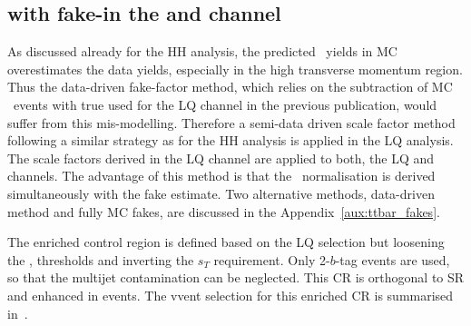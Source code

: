 \subsection{\ttbar with fake-\tauhad in the \lephad and \hadhad channel}
\label{subsec:LQLepHadttbarfake}

As discussed already for the HH analysis, the predicted \ttbar\ yields in MC overestimates the data yields, especially in 
the high transverse momentum region. Thus the data-driven fake-factor method, which relies on the subtraction of 
MC \ttbar\ events with true \tauhad used for the LQ \lephad channel in the previous publication, would suffer from this \ttbar mis-modelling.
Therefore a semi-data driven scale factor method following a similar strategy as for the HH analysis is applied in the LQ analysis.
The scale factors derived in the LQ \lephad channel are applied to both, the LQ \lephad and \hadhad channels. The advantage of this method
is that the \ttbar\ normalisation is derived simultaneously with the fake estimate.
Two alternative methods, data-driven method and fully MC fakes, are  discussed in the Appendix~\ref{aux:ttbar_fakes}.

The \ttbar enriched control region is defined based on the LQ \lephad selection but loosening the \tauhad \pT, \MET thresholds and inverting the
$s_T$ requirement. Only 2-$b$-tag events are used, so that the multijet contamination can be neglected. This CR is orthogonal to SR and
enhanced in \ttbar events. The vvent selection for this \ttbar enriched CR is summarised in~.


